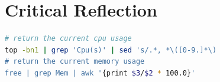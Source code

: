 \documentclass[11pt]{article}
\begin{document}
\section{Critical Reflection}




\newpage
\appendix

\begin{lstlisting}[language=bash, label={lst:cpumem}, caption={Extract from the Python script used to determine which of the computers on the university network are suitable for rendering on. By capturing the output of the following commands I was able to get the current CPU and memory usage.}]
# return the current cpu usage
top -bn1 | grep 'Cpu(s)' | sed 's/.*, *\([0-9.]*\)
# return the current memory usage
free | grep Mem | awk '{print $3/$2 * 100.0}'
\end{lstlisting}
\end{document}
